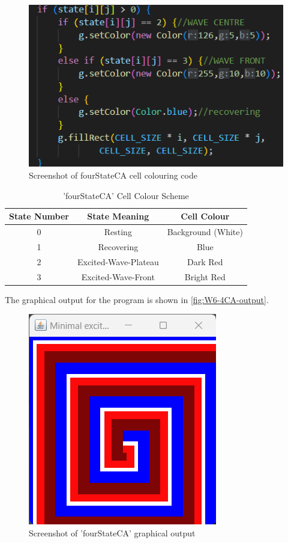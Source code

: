 \begin{figure}[H] 
    \centering
    \includegraphics[width=1\columnwidth]{Figures/Week 6/4stateCA-color-code.png}
    \caption{Screenshot of fourStateCA cell colouring code}
    \label{fig:W6-4CA-colour-code}
\end{figure}

\vspace{10mm}
\begin{table}[htbp]
  \centering
  \begin{tabular}{|c|c|c|}
    \hline
    \textbf{State Number} &\textbf{State Meaning} & \textbf{Cell Colour} \\

    \hline
    0 & Resting & Background (White)\\
    \hline
    1 & Recovering & Blue \\
    \hline
    2 & Excited-Wave-Plateau & Dark Red \\
    \hline
    3 & Excited-Wave-Front & Bright Red \\
    \hline
  \end{tabular}
  \caption{'fourStateCA' Cell Colour Scheme}
  \label{tab:state-color-values}
\end{table}

The graphical output for the program is shown in \autoref{fig:W6-4CA-output}.
\begin{figure}[H] 
    \centering
    \includegraphics[width=0.49\columnwidth]{Figures/Week 6/4stateCA-output.png}
    \caption{Screenshot of 'fourStateCA' graphical output}
    \label{fig:W6-4CA-output}
\end{figure}
\newpage
